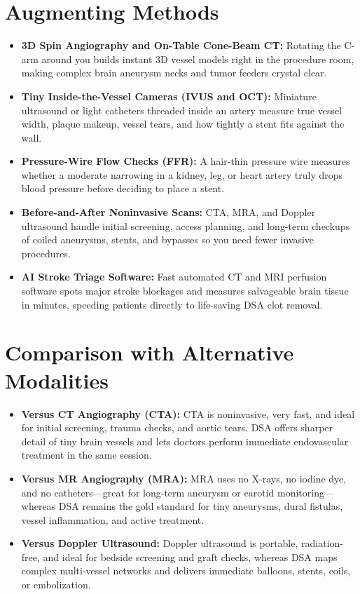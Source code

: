 \section{Augmenting Methods}
\begin{itemize}
\item \textbf{3D Spin Angiography and On-Table Cone-Beam CT:} Rotating the C-arm around you builds instant 3D vessel models right in the procedure room, making complex brain aneurysm necks and tumor feeders crystal clear.
\item \textbf{Tiny Inside-the-Vessel Cameras (IVUS and OCT):} Miniature ultrasound or light catheters threaded inside an artery measure true vessel width, plaque makeup, vessel tears, and how tightly a stent fits against the wall.
\item \textbf{Pressure-Wire Flow Checks (FFR):} A hair-thin pressure wire measures whether a moderate narrowing in a kidney, leg, or heart artery truly drops blood pressure before deciding to place a stent.
\item \textbf{Before-and-After Noninvasive Scans:} CTA, MRA, and Doppler ultrasound handle initial screening, access planning, and long-term checkups of coiled aneurysms, stents, and bypasses so you need fewer invasive procedures.
\item \textbf{AI Stroke Triage Software:} Fast automated CT and MRI perfusion software spots major stroke blockages and measures salvageable brain tissue in minutes, speeding patients directly to life-saving DSA clot removal.
\end{itemize}

\section{Comparison with Alternative Modalities}
\begin{itemize}
\item \textbf{Versus CT Angiography (CTA):} CTA is noninvasive, very fast, and ideal for initial screening, trauma checks, and aortic tears. DSA offers sharper detail of tiny brain vessels and lets doctors perform immediate endovascular treatment in the same session.
\item \textbf{Versus MR Angiography (MRA):} MRA uses no X-rays, no iodine dye, and no catheters---great for long-term aneurysm or carotid monitoring---whereas DSA remains the gold standard for tiny aneurysms, dural fistulas, vessel inflammation, and active treatment.
\item \textbf{Versus Doppler Ultrasound:} Doppler ultrasound is portable, radiation-free, and ideal for bedside screening and graft checks, whereas DSA maps complex multi-vessel networks and delivers immediate balloons, stents, coils, or embolization.
\end{itemize}

